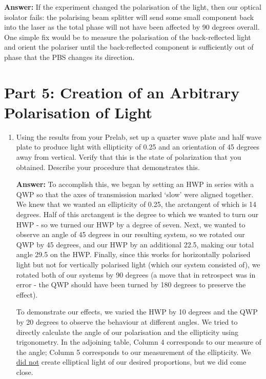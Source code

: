 \documentclass[10pt,a4paper]{article}
\begin{document}
\begin{enumerate}
\textbf{Answer: } If the experiment changed the polarisation of the light, then our optical isolator fails: the polarising beam splitter will send some small component back into the laser as the total phase will not have been affected by 90 degrees overall. One simple fix would be to measure the polarisation of the back-reflected light and orient the polariser until the back-reflected component is sufficiently out of phase that the PBS changes its direction. 
\end{enumerate}
\section*{Part 5: Creation of an Arbitrary Polarisation of Light}
\begin{enumerate}
\item Using the results from your Prelab, set up a quarter wave plate and half wave plate to produce light with ellipticity of 0.25 and an orientation of 45 degrees away from vertical. Verify that this is the state of polarization that you obtained. Describe your procedure that demonstrates this.

\textbf{Answer: } To accomplish this, we began by setting an HWP in series with a QWP so that the axes of transmission marked `slow' were aligned together. We knew that we wanted an ellipticity of 0.25, the arctangent of which is 14 degrees. Half of this arctangent is the degree to which we wanted to turn our HWP - so we turned our HWP by a degree of seven. Next, we wanted to observe an angle of 45 degrees in our resulting system, so we rotated our QWP by 45 degrees, and our HWP by an additional 22.5, making our total angle 29.5 on the HWP. Finally, since this works for horizontally polarised light but not for vertically polarised light (which our system consisted of), we rotated both of our systems by 90 degrees (a move that in retrospect was in error - the QWP should have been turned by 180 degrees to preserve the effect). 

To demonstrate our effects, we varied the HWP by 10 degrees and the QWP by 20 degrees to observe the behaviour at different angles. We tried to directly calculate the angle of our polarisation and the ellipticity using trigonometry. In the adjoining table, Column 4 corresponds to our measure of the angle; Column 5 corresponds to our measurement of the ellipticity. We \ul{did not} create elliptical light of our desired proportions, but we did come close.
\end{enumerate}
\end{document}
